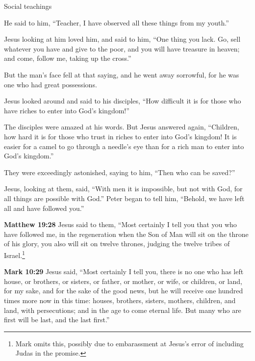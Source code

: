 \documentclass[10pt,a5paper,twoside]{article}
\newcommand{\quotesize}{\normalsize{}}
\newenvironment{quotetext}{\begingroup\quotesize}{\endgroup}
\newcommand{\intex}[1]{\index[texts]{#1}}
\newcommand{\bible}[2]{\begin{quotetext}\textbf{#1}\intex{#1} #2\end{quotetext}}
\newcommand{\matthew}[2]{\bible{Matthew #1}{#2}}
\newcommand{\gospelmark}[2]{\bible{Mark #1}{#2}}
\begin{document}
\begin{section}{Social teachings}
{%

  He said to him, ``Teacher, I have observed all these things from my youth.''

  Jesus looking at him loved him, and said to him, ``One thing you lack. Go, sell whatever you have and give to the poor, and you will have treasure in heaven; and come, follow me, taking up the cross.''

  But the man's face fell at that saying, and he went away sorrowful, for he was one who had great possessions.

  Jesus looked around and said to his disciples, ``How difficult it is for those who have riches to enter into God's kingdom!''

  The disciples were amazed at his words. But Jesus answered again, ``Children, how hard it is for those who trust in riches to enter into God's kingdom!    It is easier for a camel to go through a needle's eye than for a rich man to enter into God's kingdom.''

  They were exceedingly astonished, saying to him, ``Then who can be saved?''

  Jesus, looking at them, said, ``With men it is impossible, but not with God, for all things are possible with God.'' 
 Peter began to tell him, ``Behold, we have left all and have followed you.''
}

\matthew{19:28}{
Jesus said to them, ``Most certainly I tell you that you who have followed me, in the regeneration when the Son of Man will sit on the throne of his glory, you also will sit on twelve thrones, judging the twelve tribes of Israel.\footnote{Mark omits this, possibly due to  embarassment
at Jesus's error of including Judas in the promise.}
}

\gospelmark{10:29}{
  Jesus said, ``Most certainly I tell you, there is no one who has left house, or brothers, or sisters, or father, or mother, or wife, or children, or land, for my sake, and for the sake of the good news,    but he will receive one hundred times more now in this time: houses, brothers, sisters, mothers, children, and land, with persecutions; and in the age to come eternal life.    But many who are first will be last, and the last first.'' }

\end{section}
\end{document}
